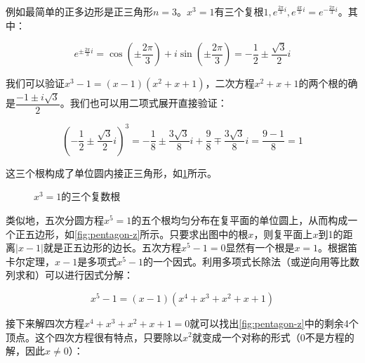 \documentclass[b5paper]{ctexart}
\begin{document}
例如最简单的正多边形是正三角形$n = 3$。$x^3 = 1$有三个复根$1, e^{\frac{2\pi}{3}i}, e^{\frac{4\pi}{3}i} = e^{-\frac{2\pi}{3}i}$。其中：

\[
e^{\pm \frac{2\pi}{3}i} = \cos (\pm \frac{2\pi}{3}) + i \sin (\pm \frac{2\pi}{3}) = -\frac{1}{2} \pm \frac{\sqrt{3}}{2}i
\]

我们可以验证$x^3 - 1 = (x - 1)(x^2 + x + 1)$，二次方程$x^2 + x + 1$的两个根的确是$\dfrac{-1 \pm i\sqrt{3}}{2}$。我们也可以用二项式展开直接验证：

\[
(-\frac{1}{2} \pm \frac{\sqrt{3}}{2}i)^3 = -\frac{1}{8} \pm \frac{3\sqrt{3}}{8}i + \frac{9}{8} \mp \frac{3\sqrt{3}}{8}i = \frac{9-1}{8} = 1
\]

这三个根构成了单位圆内接正三角形，如\cref{fig:3rd-root-of-1}所示。

\begin{figure}[htbp]
\centering
{}
\caption{$x^3 = 1$的三个复数根}
\label{fig:3rd-root-of-1}
\end{figure}

类似地，五次分圆方程$x^5 = 1$的五个根均匀分布在复平面的单位圆上，从而构成一个正五边形，如\cref{fig:pentagon-z}所示。只要求出图中的根$x$，则复平面上$x$到1的距离$|x-1|$就是正五边形的边长。五次方程$x^5 - 1 = 0$显然有一个根是$x = 1$。根据笛卡尔定理，$x-1$是多项式$x^5 - 1$的一个因式。利用多项式长除法（或逆向用等比数列求和）可以进行因式分解：

\[
x^5 - 1 = (x - 1)(x^4 + x^3 + x^2 + x + 1)
\]

接下来解四次方程$x^4 + x^3 + x^2 + x + 1 = 0$就可以找出\cref{fig:pentagon-z}中的剩余4个顶点。这个四次方程很有特点，只要除以$x^2$就变成一个对称的形式（0不是方程的解，因此$x \ne 0$）：
\end{document}
